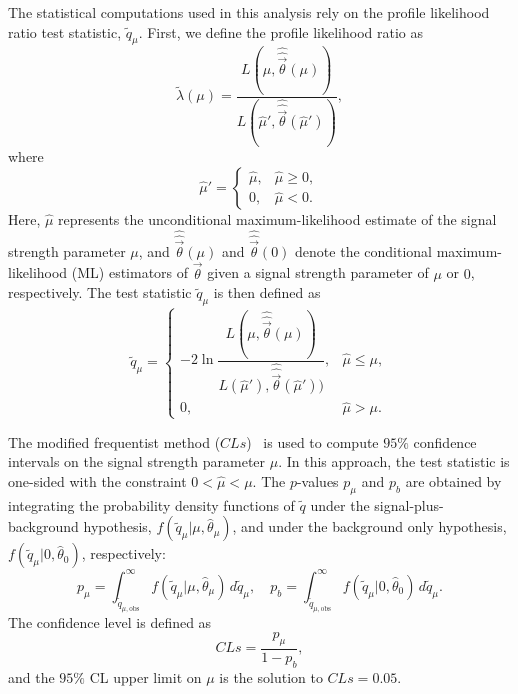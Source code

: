 The statistical computations used in this analysis rely on the profile likelihood ratio test statistic, $\tilde{q}_{\mu}$. 
First, we define the profile likelihood ratio as
\begin{equation}
\tilde{\lambda}(\mu) =
\frac{L\!\left(\mu, \hat{\hat{\vec{\theta}}}(\mu)\right)}
{L\!\left(\hat{\mu}', \hat{\hat{\vec{\theta}}}(\hat{\mu}')\right)},
\end{equation}
where
\begin{equation}
\hat{\mu}' =
\begin{cases}
\hat{\mu}, & \hat{\mu} \ge 0, \\
0, & \hat{\mu} < 0.
\end{cases}
\end{equation}
Here, $\hat{\mu}$ represents the unconditional maximum-likelihood estimate of the signal strength parameter $\mu$, and $\hat{\hat{\vec{\theta}}}(\mu)$ and $\hat{\hat{\vec{\theta}}}(0)$ denote the conditional maximum-likelihood (ML) estimators of $\vec{\theta}$ given a signal strength parameter of $\mu$ or $0$, respectively. 
The test statistic $\tilde{q}_{\mu}$ is then defined as
\begin{equation}
\tilde{q}_{\mu} =
\begin{cases}
- 2 \ln \dfrac{L(\mu, \hat{\hat{\vec{\theta}}}(\mu))}
{L(\hat{\mu}'), \hat{\hat{\vec{\theta}}}(\hat{\mu}'))}, & \hat{\mu} \le \mu, \\[0.3cm]
0, & \hat{\mu} > \mu.
\end{cases}
\end{equation}

\noindent The modified frequentist method (\(CLs\))~\cite{A_L_Read_2002} is used to compute $95\%$ confidence intervals on the signal strength parameter $\mu$. In this approach, the test statistic is one-sided with the constraint $0 < \hat{\mu} < \mu$. The $p$-values $p_{\mu}$ and $p_{b}$ are obtained by integrating the probability density functions of $\tilde{q}$ under the signal-plus-background hypothesis, $f(\tilde{q}_{\mu}|\mu,\hat{\theta}_{\mu})$, and under the background only hypothesis, $f(\tilde{q}_{\mu}|0,\hat{\theta}_{0})$, respectively:
\begin{equation}
p_{\mu} = \int_{\tilde{q}_{\mu,\mathrm{obs}}}^{\infty} f(\tilde{q}_{\mu}|\mu,\hat{\theta}_{\mu}) \, d\tilde{q}_{\mu},
\quad
p_{b} = \int_{\tilde{q}_{\mu,\mathrm{obs}}}^{\infty} f(\tilde{q}_{\mu}|0,\hat{\theta}_{0}) \, d\tilde{q}_{\mu}.
\end{equation}
The confidence level is defined as
\begin{equation}
CLs = \frac{p_{\mu}}{1 - p_{b}},
\end{equation}
and the $95\%$ CL upper limit on $\mu$ is the solution to $CLs = 0.05$.

